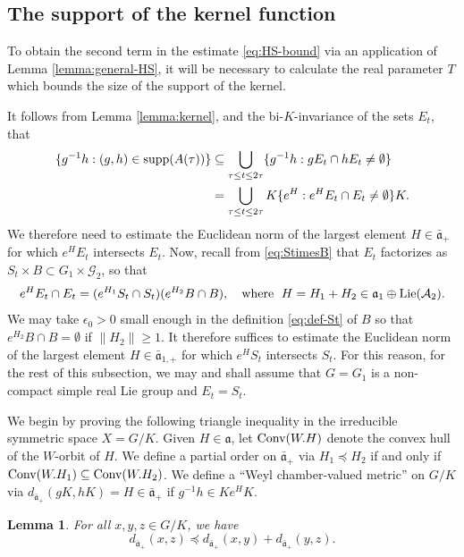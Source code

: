 \documentclass[12pt]{amsart}
\newtheorem{lemma}[theorem]{Lemma}
\theoremstyle{remark}
\newcommand{\ga}{\mathfrak a}
\begin{document}
\subsection{The support of the kernel function}\label{sec:ker-supp}
To obtain the second term in the estimate \eqref{eq:HS-bound} via an application of Lemma \ref{lemma:general-HS}, it will be necessary to calculate the real parameter $T$ which bounds the size of the support of the kernel.

It follows from Lemma \ref{lemma:kernel}, and the bi-$K$-invariance of the sets $E_t$, that 
\begin{equation}\label{eq:support-kernel}
\begin{aligned}
\{g^{-1}h: (g,h)\in {\rm supp}(A(\tau))\} &\subseteq \bigcup_{\tau \le t \le 2\tau} \{g^{-1}h: gE_t\cap hE_t\neq\emptyset\}\\
& = \bigcup_{\tau \le t \le 2\tau} K\{e^H : e^H E_t\cap  E_t\neq\emptyset\}K.
\end{aligned}
\end{equation}
We therefore need to estimate the Euclidean norm of the largest element $H\in\bar{\ga}_+$ for which $e^HE_t$ intersects $E_t$. Now, recall from \eqref{eq:StimesB} that $E_t$ factorizes as $S_t\times B \subset G_1\times\mathcal{G}_2$, so that 
\begin{equation}\label{eq:inter-fact}
e^HE_t\cap E_t=(e^{H_1} S_t\cap S_t)(e^{H_2}B\cap B), \quad\textrm{where }\; H=H_1+H_2\in\ga_1\oplus {\rm Lie}(\mathcal{A}_2).
\end{equation}
We may take $\epsilon_0>0$ small enough in the definition \eqref{eq:def-St} of $B$ so that $e^{H_2}B\cap B=\emptyset$ if $\|H_2\|\geq 1$. It therefore suffices to estimate the Euclidean norm of the largest element $H\in\bar{\ga}_{1,+}$ for which $e^HS_t$ intersects $S_t$. For this reason, for the rest of this subsection, we may and shall assume that $G=G_1$ is a non-compact simple real Lie group and $E_t=S_t$.

We begin by proving the following triangle inequality in the irreducible symmetric space $X=G/K$. Given $H \in \ga$, let $\textnormal{Conv}(W.H)$ denote the convex hull of the $W$-orbit of $H$. We define a partial order on $\bar{\ga}_+$ via $H_1 \preceq H_2$ if and only if $\textnormal{Conv}(W. H_1) \subseteq \textnormal{Conv}(W. H_2)$. We define a ``Weyl chamber-valued metric'' on $G/K$ via $d_{\bar{\ga}_+}(gK, hK) = H \in \bar{\ga}_+$ if $g^{-1} h \in K e^H K$.

\begin{lemma}\label{lemma:triangle}
For all $x, y, z \in G/K$, we have
\[
        d_{\bar{\ga}_+}(x, z) \preceq d_{\bar{\ga}_+}(x, y) + d_{\bar{\ga}_+}(y, z).
  \]
    \end{lemma}
\end{document}
